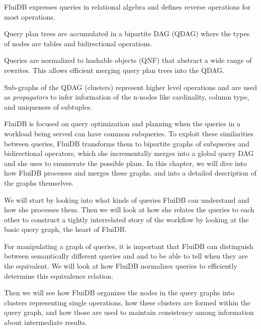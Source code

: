
\begin{summary}
\item FluiDB expresses queries in relational algebra and defines
  reverse operations for most operations.
\item Query plan trees are accumulated in a bipartite DAG (QDAG) where
  the types of nodes are tables and bidirectional operations.
\item Queries are normalized to hashable objects (QNF) that abstract a
  wide range of rewrites. This allows efficient merging query plan
  trees into the QDAG.
\item Sub-graphs of the QDAG (clusters) represent higher level
  operations and are used as \emph{propagators} to infer information
  of the n-nodes like cardinality, column type, and uniqueness of
  subtuples.
\end{summary}

FluiDB is focused on query optimization and planning when the queries
in a workload being served can have common subqueries.  To exploit
these similarities between queries, FluiDB transforms them to
bipartite graphs of subqueries and bidirectional operators, which she
incrementally merges into a global query DAG and she uses to enumerate
the possible plans.  In this chapter, we will dive into how FluiDB
processes and merges these graphs. and into a detailed description of
the graphs themselves.

We will start by looking into what kinds of queries FluiDB can
understand and how she processes them. Then we will look at how she
relates the queries to each other to construct a tightly interrelated
story of the workflow by looking at the basic query graph, the heart
of FluiDB.

For manipulating a graph of queries, it is important that FluiDB can
distinguish between semantically different queries and and to be able
to tell when they are the equivalent.  We will look at how FluiDB
normalizes queries to efficiently determine this equivalence relation.

Then we will see how FluiDB organizes the nodes in the query graphs
into clusters representing single operations, how these clusters are
formed within the query graph, and how those are used to maintain
consistency among information about intermediate results.


